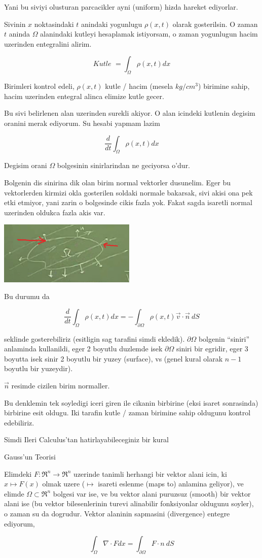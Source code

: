 \documentclass[12pt,fleqn]{article}
\begin{document}
Yani bu siviyi olusturan parcacikler ayni (uniform) hizda hareket
ediyorlar. 

Sivinin $x$ noktasindaki $t$ anindaki yogunlugu $\rho(x,t)$ olarak
gosterilsin. O zaman $t$ aninda $\Omega$ alanindaki kutleyi hesaplamak
istiyorsam, o zaman yogunlugun hacim uzerinden entegralini alirim. 

\[ \textit{Kutle } = \int_\Omega \rho(x,t) dx \]

Birimleri kontrol edeli, $\rho(x,t)$ kutle / hacim (mesela $kg / cm^3$)
birimine sahip, hacim uzerinden entegral alinca elimize kutle gecer. 

Bu sivi belirlenen alan uzerinden surekli akiyor. O alan icindeki kutlenin
degisim oranini merak ediyorum. Su hesabi yapmam lazim

\[ \frac{d}{dt} \int_\Omega \rho(x,t) dx   \]


Degisim orani $\Omega$ bolgesinin sinirlarindan ne geciyorsa o'dur. 

Bolgenin dis sinirina dik olan birim normal vektorler dusunelim. Eger bu
vektorlerden kirmizi okla gosterilen soldaki normale bakarsak, sivi akisi
ona pek etki etmiyor, yani zarin o bolgesinde cikis fazla yok. Fakat sagda
isaretli normal uzerinden oldukca fazla akis var.

\includegraphics[height=3cm]{pde_02.png}

Bu durumu da

\[ \frac{d}{dt} \int_\Omega \rho(x,t) dx   = 
- \int_{\partial \Omega} \rho(x,t) \vec{v} \cdot \vec{n} \ dS 
\]

seklinde gosterebiliriz (esitligin sag tarafini simdi ekledik). $\partial
\Omega$ bolgenin 
``siniri'' anlaminda kullanildi, eger 2 boyutlu duzlemde isek
$\partial \Omega$ siniri bir egridir, eger 3 boyutta isek sinir 2 boyutlu bir
yuzey (surface), vs (genel kural olarak $n-1$ boyutlu bir yuzeydir).

$\vec{n}$ resimde cizilen birim normaller. 

Bu denklemin tek soyledigi iceri giren ile cikanin birbirine (eksi isaret
sonrasinda) birbirine esit oldugu. Iki tarafin kutle / zaman birimine sahip
oldugunu kontrol edebiliriz. 

Simdi Ileri Calculus'tan hatirlayabileceginiz bir kural 

Gauss'un Teorisi

Elimdeki $F: \Re^n \to \Re^n$ uzerinde tanimli herhangi bir vektor alani
icin, ki $x \mapsto F(x)$ olmak uzere ($\mapsto$ isareti eslenme (maps to)
anlamina geliyor), ve elimde $\Omega \subset \Re^n$ bolgesi var ise, ve bu
vektor alani puruzsuz (smooth) bir vektor alani ise (bu vektor
bilesenlerinin turevi alinabilir fonksiyonlar oldugunu soyler), o zaman su
da dogrudur. Vektor alaninin sapmasini (divergence) entegre ediyorum, 

\[ 
\int_\Omega \nabla \cdot F dx =
\int_{\partial \Omega} F \cdot n \ dS
\]
\end{document}
